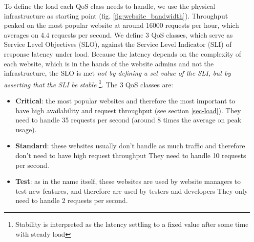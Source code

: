 To define the load each QoS class needs to handle, we use the physical infrastructure as starting point (fig. \ref{fig:website_bandwidth}).
Throughput peaked on the most popular website at around 16000 requests per hour, which averages on 4.4 requests per second.
We define 3 QoS classes, which serve as Service Level Objectives (SLO), against the Service Level Indicator (SLI) of response latency under load.
Because the latency depends on the complexity of each website, which is in the hands of the website admins and not the infrastructure,
the SLO is met \emph{not by defining a set value of the SLI, but by asserting that the SLI be stable}
\footnote{Stability is interpreted as the latency settling to a fixed value after some time with steady load}.
The 3 QoS classes are:

\begin{itemize}
    \item \textbf{Critical}: the most popular websites and therefore the most important to have high availability and request throughput (see section \ref{sec-load}).
    They need to handle 35 requests per second (around 8 times the average on peak usage).
    \item \textbf{Standard}: these websites usually don't handle as much traffic and therefore don't need to have high request throughput
    They need to handle 10 requests per second. 
    \item \textbf{Test}: as in the name itself, these websites are used by website managers to test new features, and therefore are used by testers and developers
    They only need to handle 2 requests per second.
\end{itemize}




